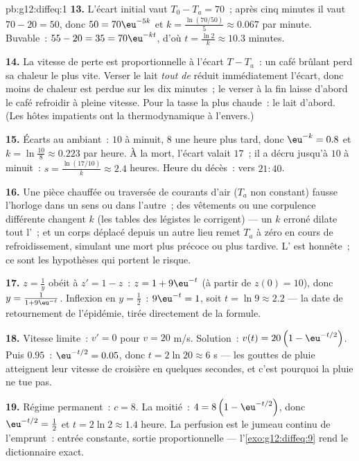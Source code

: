 \begin{solution}{pb:g12:diffeq:1}
\textbf{13.} L'écart initial vaut $T_0 - T_a = 70$~; après cinq
minutes il vaut $70 - 20 = 50$, donc $50 = 70\eu^{-5k}$ et
$k = \frac{\ln(70/50)}{5} \approx 0.067$ par minute. Buvable~:
$55 - 20 = 35 = 70\eu^{-kt}$, d'où
$t = \frac{\ln 2}{k} \approx 10.3$ minutes.

\textbf{14.} La vitesse de perte est proportionnelle à l'écart
$T - T_a$~: un café brûlant perd sa chaleur le plus vite. Verser le
lait \emph{tout de } réduit immédiatement l'écart, donc moins
de chaleur est perdue sur les dix minutes~; le verser à la fin
laisse d'abord le café refroidir à pleine vitesse. Pour la tasse la
plus chaude~: le lait d'abord. (Les hôtes impatients ont la
thermodynamique à l'envers.)

\textbf{15.} Écarts au  ambiant~: $10$ à minuit, $8$ une
heure plus tard, donc $\eu^{-k} = 0.8$ et
$k = \ln\frac{10}{8} \approx 0.223$ par heure. À la mort, l'écart
valait $17$~; il a décru jusqu'à $10$ à minuit~:
$s = \frac{\ln(17/10)}{k} \approx 2.4$ heures. Heure du décès~:
vers $21{:}40$.

\textbf{16.} Une pièce chauffée ou traversée de courants d'air
($T_a$ non constant) fausse l'horloge dans un sens ou dans
l'autre~; des vêtements ou une corpulence différente changent $k$
(les tables des légistes le corrigent) --- un $k$ erroné dilate tout
l'~; et un corps déplacé depuis un autre lieu remet $T_a$
à zéro en cours de refroidissement, simulant une mort plus précoce
ou plus tardive. L' est honnête~; ce sont les hypothèses qui
portent le risque.

\textbf{17.} $z = \frac1y$ obéit à $z' = 1 - z$~:
$z = 1 + 9\eu^{-t}$ (à partir de $z(0) = 10$), donc
$y = \frac{1}{1 + 9\eu^{-t}}$. Inflexion en $y = \frac12$~:
$9\eu^{-t} = 1$, soit $t = \ln 9 \approx 2.2$ --- la date de
retournement de l'épidémie, tirée directement de la formule.

\textbf{18.} Vitesse limite~: $v' = 0$ pour $v = 20$ m/s.
Solution~: $v(t) = 20\left(1 - \eu^{-t/2}\right)$. Puis $0.95$~:
$\eu^{-t/2} = 0.05$, donc $t = 2\ln 20 \approx 6$ s --- les gouttes
de pluie atteignent leur vitesse de croisière en quelques secondes,
et c'est pourquoi la pluie ne tue pas.

\textbf{19.} Régime permanent~: $c = 8$. La moitié~:
$4 = 8\left(1 - \eu^{-t/2}\right)$, donc $\eu^{-t/2} = \frac12$ et
$t = 2\ln 2 \approx 1.4$ heure. La perfusion est le jumeau continu
de l'emprunt~: entrée constante, sortie proportionnelle ---
l'\cref{exo:g12:diffeq:9} rend le dictionnaire exact.


\end{solution}
